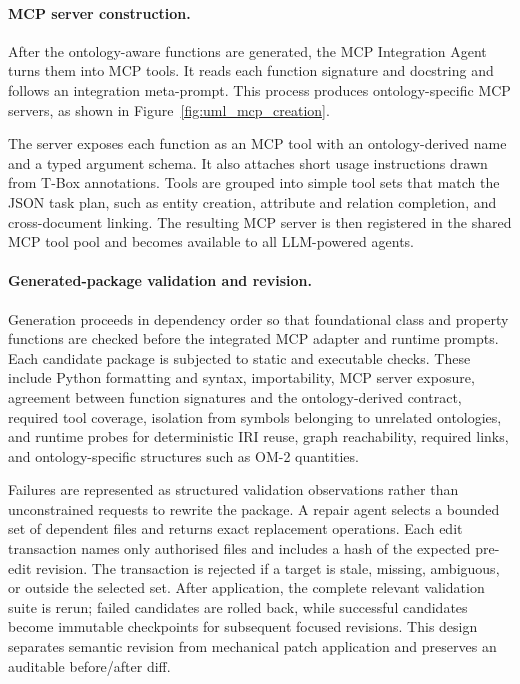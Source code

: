 \paragraph{MCP server construction.}
After the ontology-aware functions are generated, the MCP Integration Agent turns them into MCP tools. It reads each function signature and docstring and follows an integration meta-prompt. This process produces ontology-specific MCP servers, as shown in Figure~\ref{fig:uml_mcp_creation}.

The server exposes each function as an MCP tool with an ontology-derived name and a typed argument schema. It also attaches short usage instructions drawn from T-Box annotations. Tools are grouped into simple tool sets that match the JSON task plan, such as entity creation, attribute and relation completion, and cross-document linking. The resulting MCP server is then registered in the shared MCP tool pool and becomes available to all LLM-powered agents.

\paragraph{Generated-package validation and revision.}
Generation proceeds in dependency order so that foundational class and property functions are checked before the integrated MCP adapter and runtime prompts. Each candidate package is subjected to static and executable checks. These include Python formatting and syntax, importability, MCP server exposure, agreement between function signatures and the ontology-derived contract, required tool coverage, isolation from symbols belonging to unrelated ontologies, and runtime probes for deterministic IRI reuse, graph reachability, required links, and ontology-specific structures such as OM-2 quantities.

Failures are represented as structured validation observations rather than unconstrained requests to rewrite the package. A repair agent selects a bounded set of dependent files and returns exact replacement operations. Each edit transaction names only authorised files and includes a hash of the expected pre-edit revision. The transaction is rejected if a target is stale, missing, ambiguous, or outside the selected set. After application, the complete relevant validation suite is rerun; failed candidates are rolled back, while successful candidates become immutable checkpoints for subsequent focused revisions. This design separates semantic revision from mechanical patch application and preserves an auditable before/after diff.

